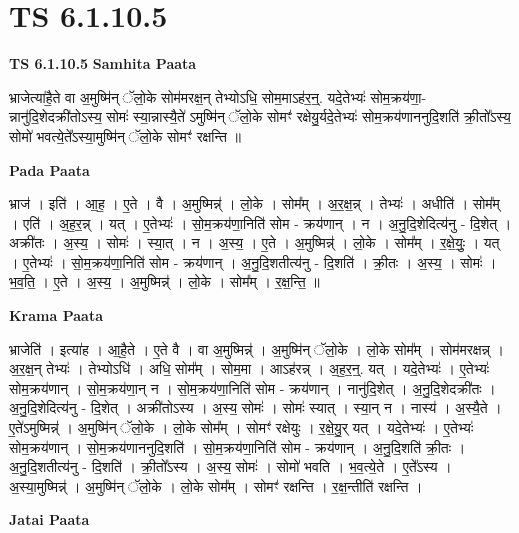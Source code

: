 \documentclass[17pt]{extarticle}
\begin{document}
\section{ TS 6.1.10.5 }

\textbf{TS 6.1.10.5 } \newline
\textbf{Samhita Paata} \newline

भ्राजेत्या॑है॒ते वा अ॒मुष्मि॑न् ॅलो॒के सोम॑मरक्ष॒न् तेभ्योऽधि॒ सोम॒माऽह॑र॒न्॒. यदे॒तेभ्यः॑ सोम॒क्रय॑णा॒-न्नानु॑दि॒शेदक्री॑तोऽस्य॒ सोमः॑ स्या॒न्नास्यै॒ते॑ ऽमुष्मि॑न् ॅलो॒के सोमꣳ॑ रक्षेयु॒र्यदे॒तेभ्यः॑ सोम॒क्रय॑णाननुदि॒शति॑ क्री॒तो᳚ऽस्य॒ सोमो॑ भवत्ये॒ते᳚ऽस्या॒मुष्मि॑न् ॅलो॒के सोमꣳ॑ रक्षन्ति ॥ \newline

\textbf{Pada Paata} \newline

भ्राज॑ । इति॑ । आ॒ह॒ । ए॒ते । वै । अ॒मुष्मिन्न्॑ । लो॒के । सोम᳚म् । अ॒र॒क्ष॒न्न् । तेभ्यः॑ । अधीति॑ । सोम᳚म् । एति॑ । अ॒ह॒र॒न्न् । यत् । ए॒तेभ्यः॑ । सो॒म॒क्रय॑णा॒निति॑ सोम - क्रय॑णान् । न । अ॒नु॒दि॒शेदित्य॑नु - दि॒शेत् । अक्री॑तः । अ॒स्य॒ । सोमः॑ । स्या॒त् । न । अ॒स्य॒ । ए॒ते । अ॒मुष्मिन्न्॑ । लो॒के । सोम᳚म् । र॒क्षे॒युः॒ । यत् । ए॒तेभ्यः॑ । सो॒म॒क्रय॑णा॒निति॑ सोम - क्रय॑णान् । अ॒नु॒दि॒शतीत्य॑नु - दि॒शति॑ । क्री॒तः । अ॒स्य॒ । सोमः॑ । भ॒व॒ति॒ । ए॒ते । अ॒स्य॒ । अ॒मुष्मिन्न्॑ । लो॒के । सोम᳚म् । र॒क्ष॒न्ति॒ ॥  \newline


\textbf{Krama Paata} \newline

भ्राजेति॑ । इत्या॑ह । आ॒है॒ते । ए॒ते वै । वा अ॒मुष्मिन्न्॑ । अ॒मुष्मि॑न् ॅलो॒के । लो॒के सोम᳚म् । सोम॑मरक्षन्न् । अ॒र॒क्ष॒न् तेभ्यः॑ । तेभ्योऽधि॑ । अधि॒ सोम᳚म् । सोम॒मा । आऽह॑रन्न् । अ॒ह॒र॒न्॒. यत् । यदे॒तेभ्यः॑ । ए॒तेभ्यः॑ सोम॒क्रय॑णान् । सो॒म॒क्रय॑णा॒न् न । सो॒म॒क्रय॑णा॒निति॑ सोम - क्रय॑णान् । नानु॑दि॒शेत् । अ॒नु॒दि॒शेदक्री॑तः । अ॒नु॒दि॒शेदित्य॑नु - दि॒शेत् । अक्री॑तोऽस्य । अ॒स्य॒ सोमः॑ । सोमः॑ स्यात् । स्या॒न् न । नास्य॑ । अ॒स्यै॒ते । ए॒ते॑ऽमुष्मिन्न्॑ । अ॒मुष्मि॑न् ॅलो॒के । लो॒के सोम᳚म् । सोमꣳ॑ रक्षेयुः । र॒क्षे॒यु॒र् यत् । यदे॒तेभ्यः॑ । ए॒तेभ्यः॑ सोम॒क्रय॑णान् । सो॒म॒क्रय॑णाननुदि॒शति॑ । सो॒म॒क्रय॑णा॒निति॑ सोम - क्रय॑णान् । अ॒नु॒दि॒शति॑ क्री॒तः । अ॒नु॒दि॒शतीत्य॑नु - दि॒शति॑ । क्री॒तो᳚ऽस्य । अ॒स्य॒ सोमः॑ । सोमो॑ भवति । भ॒व॒त्ये॒ते । ए॒ते᳚ऽस्य । अ॒स्या॒मुष्मिन्न्॑ । अ॒मुष्मि॑न् ॅलो॒के । लो॒के सोम᳚म् । सोमꣳ॑ रक्षन्ति । र॒क्ष॒न्तीति॑ रक्षन्ति । \newline

\textbf{Jatai Paata} \newline
\end{document}
